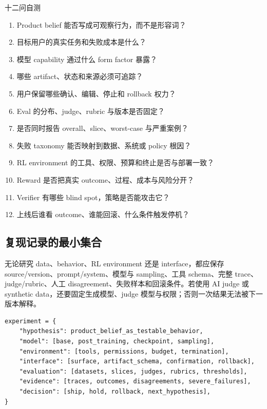 \begin{importantbox}{十二问自测}
\begin{enumerate}
  \item Product belief 能否写成可观察行为，而不是形容词？
  \item 目标用户的真实任务和失败成本是什么？
  \item 模型 capability 通过什么 form factor 暴露？
  \item 哪些 artifact、状态和来源必须可追踪？
  \item 用户保留哪些确认、编辑、停止和 rollback 权力？
  \item Eval 的分布、judge、rubric 与版本是否固定？
  \item 是否同时报告 overall、slice、worst-case 与严重案例？
  \item 失败 taxonomy 能否映射到数据、系统或 policy 根因？
  \item RL environment 的工具、权限、预算和终止是否与部署一致？
  \item Reward 是否把真实 outcome、过程、成本与风险分开？
  \item Verifier 有哪些 blind spot，策略是否能攻击它？
  \item 上线后谁看 outcome、谁能回滚、什么条件触发停机？
\end{enumerate}
\end{importantbox}

\subsection{复现记录的最小集合}

无论研究 data、behavior、RL environment 还是 interface，都应保存 source/version、prompt/system、模型与 sampling、工具 schema、完整 trace、judge/rubric、人工 disagreement、失败样本和回滚条件。若使用 AI judge 或 synthetic data，还要固定生成模型、judge 模型与权限；否则一次结果无法被下一版本解释。

\begin{lstlisting}[caption={Frontier product 实验的可复现记录}]
experiment = {
    "hypothesis": product_belief_as_testable_behavior,
    "model": [base, post_training, checkpoint, sampling],
    "environment": [tools, permissions, budget, termination],
    "interface": [surface, artifact_schema, confirmation, rollback],
    "evaluation": [datasets, slices, judges, rubrics, thresholds],
    "evidence": [traces, outcomes, disagreements, severe_failures],
    "decision": [ship, hold, rollback, next_hypothesis],
}
\end{lstlisting}

